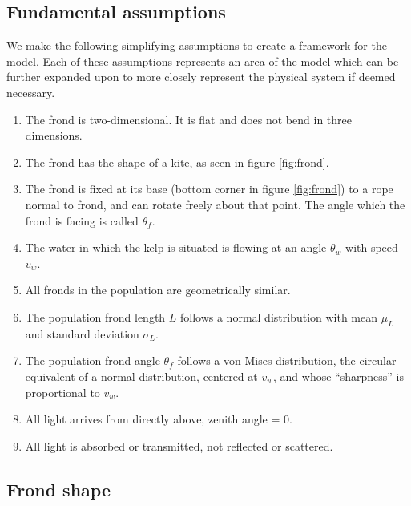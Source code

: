 \documentclass[10pt]{article}
\begin{document}
\begin{multicols}{2}
\subsection{Fundamental assumptions}
We make the following simplifying assumptions to create a framework for the model. Each of these assumptions represents an area of the model which can be further expanded upon to more closely represent the physical system if deemed necessary.
\begin{enumerate}
	\item The frond is two-dimensional. It is flat and does not bend in three dimensions.
	\item The frond has the shape of a kite, as seen in figure \ref{fig:frond}.
	\item The frond is fixed at its base (bottom corner in figure \ref{fig:frond}) to a rope normal to frond, and can rotate freely about that point. The angle which the frond is facing is called $\theta_f$.
	\item The water in which the kelp is situated is flowing at an angle $\theta_w$ with speed $v_w$.
	\item All fronds in the population are geometrically similar.
	\item The population frond length $L$ follows a normal distribution with mean $\mu_L$ and standard deviation $\sigma_L$.
	\item The population frond angle $\theta_f$ follows a von Mises distribution, the circular equivalent of a normal distribution, centered at $v_w$, and whose ``sharpness'' is proportional to $v_w$.
	\item All light arrives from directly above, zenith angle = 0\degree.
	\item All light is absorbed or transmitted, not reflected or scattered.
\end{enumerate}

\subsection{Frond shape}
\label{sec:shape}


\end{multicols}
\end{document}
